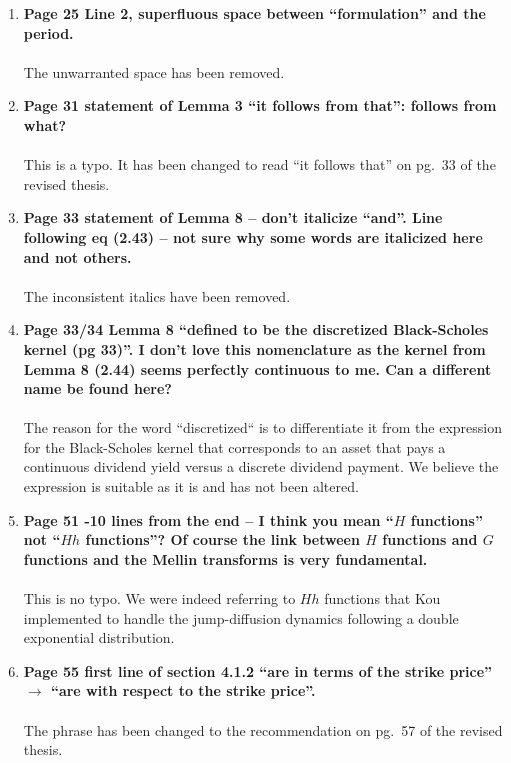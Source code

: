 \documentclass{article}
\begin{document}
\begin{enumerate}
      \item \textbf{Page 25 Line 2, superfluous space between ``formulation'' and the period.
    \\
    \\}
    The unwarranted space has been removed.
    
      \item \textbf{Page 31 statement of Lemma 3 ``it follows from that'': follows from what?
    \\
    \\}
    This is a typo. It has been changed to read ``it follows that'' on pg.~33 of the revised thesis.
    \item
     \textbf{Page 33 statement of Lemma 8 -- don't italicize ``and''. Line following eq (2.43) -- not sure why some words are italicized here and not others.
    \\
    \\}
    The inconsistent italics have been removed.
    \item \textbf{Page 33/34 Lemma 8 ``defined to be the discretized Black-Scholes kernel (pg 33)''. I don't love this nomenclature as the kernel from Lemma 8 (2.44) seems perfectly continuous to me. Can a different name be found here?
    \\
    \\}
    The reason for the word ``discretized`` is to differentiate it from the expression for the Black-Scholes kernel that corresponds to an asset that pays a continuous dividend yield versus a discrete dividend payment. We believe the expression is suitable as it is and has not been altered. 
    
     \item \textbf{Page 51 -10 lines from the end -- I think you mean ``$H$ functions'' not ``$Hh$ functions''? Of course the link between $H$ functions and $G$ functions and the Mellin transforms is very fundamental.
    \\
    \\}
    This is no typo. We were indeed referring to $Hh$ functions that Kou~\cite{Kou2002,Kou2004} implemented to handle the jump-diffusion dynamics following a double exponential distribution.
    
     \item \textbf{Page 55 first line of section 4.1.2 ``are in terms of the strike price'' $\rightarrow$ ``are with respect to the strike price''.
    \\
    \\}
    The phrase has been changed to the recommendation on pg.~57 of the revised thesis.
    

\end{enumerate}
\end{document}
